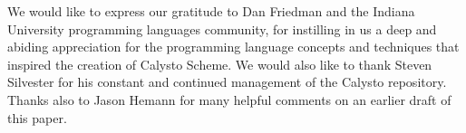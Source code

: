 \documentclass[acmsmall,screen,authorversion]{acmart}
\begin{document}
\begin{acks}
We would like to express our gratitude to Dan Friedman and the Indiana
University programming languages community, for instilling in us a
deep and abiding appreciation for the programming language concepts
and techniques that inspired the creation of Calysto Scheme.  We would
also like to thank Steven Silvester for his constant and continued
management of the Calysto repository. Thanks also to Jason Hemann for
many helpful comments on an earlier draft of this paper.
\end{acks}



\end{document}
